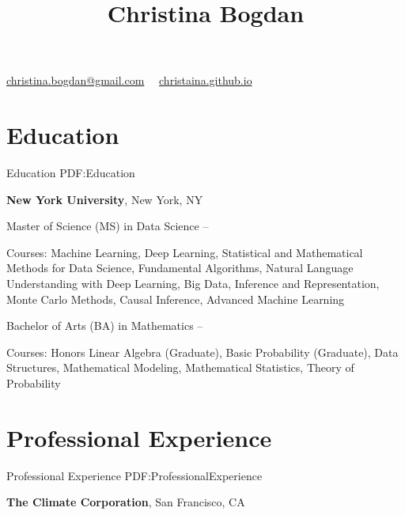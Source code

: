 \documentclass[letterpaper,9.5pt,oneside]{article}
\newcommand{\CVAuthor}{Christina Bogdan}
\begin{document}

\title{\CVAuthor}

\begin{subtitle}

\par
\href{mailto:christina.bogdan@gmail.com}
{christina.bogdan@gmail.com}
\, \SubBulletSymbol \, \url{christaina.github.io}
\end{subtitle}

\begin{body}


\section
{Education}
{Education}
{PDF:Education}


\textbf{New York University},
New York, NY

\GapNoBreak
Master of Science (MS) in
Data Science
\hfill
{} --
\begin{detail}
\BulletItem
Courses: Machine Learning, Deep Learning, Statistical and Mathematical Methods for Data Science, Fundamental Algorithms, Natural Language Understanding with Deep Learning, Big Data, Inference and Representation, Monte Carlo Methods, Causal Inference, Advanced Machine Learning
\end{detail}

\GapNoBreak
Bachelor of Arts (BA) in Mathematics
\hfill
{} --
\begin{detail}
\BulletItem
Courses: Honors Linear Algebra (Graduate), Basic Probability (Graduate), Data Structures, Mathematical Modeling, Mathematical Statistics, Theory of Probability
\end{detail}



\section
{Professional Experience}
{Professional Experience}
{PDF:ProfessionalExperience}


\textbf{The Climate Corporation},
San Francisco, CA


\end{body}
\end{document}
